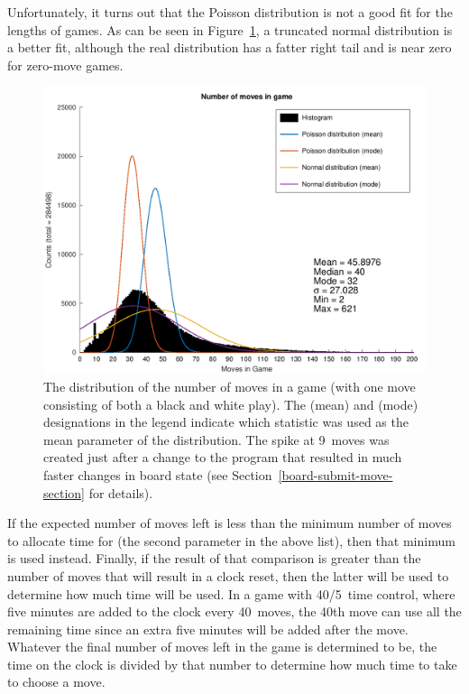 \documentclass[letterpaper]{article}
\renewcommand\_{\textunderscore\allowbreak}
\begin{document}
Unfortunately, it turns out that the Poisson distribution is not a good fit for the lengths of games. As can be seen in Figure~\ref{game-length-plot}, a truncated normal distribution is a better fit, although the real distribution has a fatter right tail and is near zero for zero-move games.
\begin{figure}[tbh]
	\centering
	\includegraphics[width=\textwidth]{game_length_distribution.png}
	\caption{The distribution of the number of moves in a game (with one move consisting of both a black and white play). The (mean) and (mode) designations in the legend indicate which statistic was used as the mean parameter of the distribution. The spike at 9~moves was created just after a change to the program that resulted in much faster changes in board state (see Section~\ref{board-submit-move-section} for details).}
	\label{game-length-plot}
\end{figure}

If the expected number of moves left is less than the minimum number of moves to allocate time for (the second parameter in the above list), then that minimum is used instead. Finally, if the result of that comparison is greater than the number of moves that will result in a clock reset, then the latter will be used to determine how much time will be used. In a game with 40/5~time control, where five minutes are added to the clock every 40~moves, the 40th move can use all the remaining time since an extra five minutes will be added after the move. Whatever the final number of moves left in the game is determined to be, the time on the clock is divided by that number to determine how much time to take to choose a move.
\end{document}
